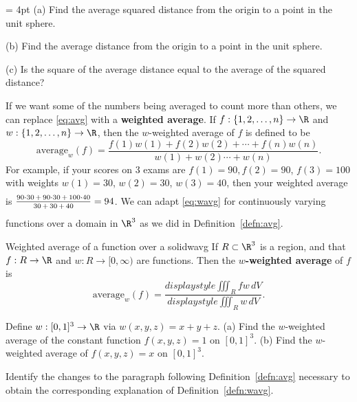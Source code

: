 \documentclass[indent]{watsonbook}
\begin{document}
{\begin{exercise}{}{} \parskip = 4pt
  (a) Find the average squared distance from the origin to a point in
  the unit sphere.

  (b) Find the average distance from the origin to a point in the unit
  sphere.

  (c) Is the square of the average distance equal to the average of
  the squared distance?
\end{exercise}

If we want some of the numbers being averaged to count more than
others, we can replace \eqref{eq:avg} with a \textbf{weighted
  average}. If $f:\{1,2,\ldots,n\} \rightarrow \R$ and
$w:\{1,2,\ldots,n\} \rightarrow \R$, then the $w$-weighted average of
$f$ is defined to be
\begin{equation} \label{eq:wavg} \mathrm{average}_w(f) =
  \frac{f(1)w(1) + f(2)w(2) + \cdots + f(n)w(n)}{w(1)+w(2) \cdots +
    w(n)}.
\end{equation}
For example, if your scores on 3 exams are $f(1)=90, f(2)=90$,
$f(3)=100$ with weights $w(1)=30$, $w(2)=30$, $w(3)=40$, then your
weighted average is
$\rule[-12pt]{0pt}{24pt}\tfrac{\rule[-2pt]{0pt}{12pt} 90\cdot 30 \,+\,
  90\cdot 30 \,+\, 100 \cdot 40}{\rule{0pt}{6pt} 30\,+\,30\,+\,40} = 94$. We
can adapt \eqref{eq:wavg} for continuously varying functions over a
domain in $\R^3$ as we did in Definition~\ref{defn:avg}.

\begin{defn}{Weighted average of a function over a solid}{wavg}
  If $R\subset \R^3$ is a region, and that $f : R \to \R$ and
  $w : R \to [0,\infty)$ are functions. Then the \textbf{$w$-weighted
    average} of $f$ is
  \[
    \mathrm{average}_w(f) = \frac{{d}isplaystyle{\iiint_R f w\,
        dV}}{{d}isplaystyle{\iiint_R w \, dV}}.
  \]
\end{defn}

\begin{exercise}{}{}
  Define $w : [0,1]^3 \to \R$ via $w(x,y,z) = x+y+z$. (a) Find the
  $w$-weighted average of the constant function $f(x,y,z) = 1$ on
  $[0,1]^3$. (b) Find the $w$-weighted average of $f(x,y,z) = x$ on
  $[0,1]^3$.
\end{exercise}

\begin{exercise}{}{}
  Identify the changes to the paragraph following
  Definition~\ref{defn:avg} necessary to obtain the corresponding
  explanation of Definition~\ref{defn:wavg}.
\end{exercise}

}
\end{document}
